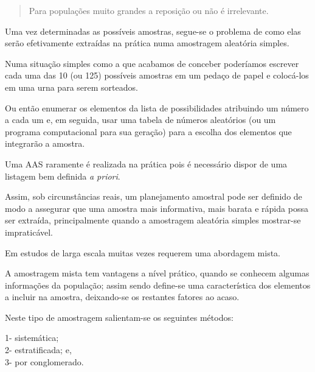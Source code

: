 \documentclass[
]{book}
\begin{document}
\hfill\break

\begin{quote}
Para populações muito grandes a reposição ou não é irrelevante.
\end{quote}

\hfill\break

Uma vez determinadas as possíveis amostras, segue-se o problema de como elas serão efetivamente extraídas na prática numa amostragem aleatória simples.

\hfill\break

Numa situação simples como a que acabamos de conceber poderíamos escrever cada uma das 10 (ou 125) possíveis amostras em um pedaço de papel e colocá-los em uma urna para serem sorteados.

\hfill\break

Ou então enumerar os elementos da lista de possibilidades atribuindo um número a cada um e, em seguida, usar uma tabela de números aleatórios (ou um programa computacional para sua geração) para a escolha dos elementos que integrarão a amostra.

\hfill\break

Uma AAS raramente é realizada na prática pois é necessário dispor de uma listagem bem definida \emph{a priori}.

\hfill\break

Assim, sob circunstâncias reais, um planejamento amostral pode ser definido de modo a assegurar que uma amostra mais informativa, mais barata e rápida possa ser extraída, principalmente quando a amostragem aleatória simples mostrar-se impraticável.

\hfill\break

Em estudos de larga escala muitas vezes requerem uma abordagem mista.

\hfill\break

A amostragem mista tem vantagens a nível prático, quando se conhecem algumas informações da população; assim sendo define-se uma característica dos elementos a incluir na amostra, deixando-se os restantes fatores ao acaso.

\hfill\break

Neste tipo de amostragem salientam-se os seguintes métodos:

\hfill\break

1- sistemática;\\
2- estratificada; e,\\
3- por conglomerado.

\hfill\break
\end{document}

